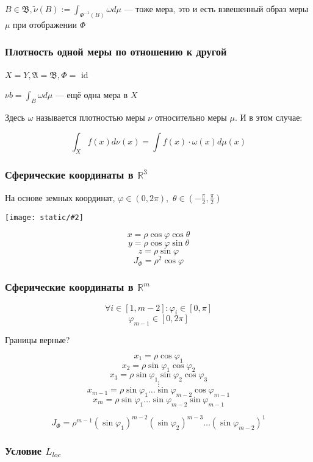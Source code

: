 \documentclass{article}
\def\dbl{\,\,}
\def\images#1#2{\begin{center}\texttt{[image: static/\#2]}\end{center}}
\begin{document}
$B \in \mathfrak{B}, \tilde{\nu}(B) := \int_{\Phi^{-1}(B)} \omega d\mu$ --- тоже мера, это и есть взвешенный образ меры $\mu$ при отображении $\Phi$

\subsubsection{Плотность одной меры по отношению к другой}

$X = Y, \mathfrak{A} = \mathfrak{B}, \Phi = $ id

$\nu b = \int_{B} \omega d \mu$ --- ещё одна мера в $X$

Здесь $\omega$ называется плотностью меры $\nu$ относительно меры $\mu$. И в этом случае:

\[\int_{X}f(x)d\nu(x) = \int f(x) \cdot \omega(x) d\mu(x)\]

\subsubsection{Сферические координаты в $\mathbb{R}^3$}

На основе земных координат, $\varphi \in (0, 2\pi), \dbl \theta \in \left(-\frac{\pi}{2}, \frac{\pi}{2}\right)$

\images{0.3}{sph_3d.jpg}

\[x = \rho \cos \varphi \cos \theta\]
\[y = \rho \cos \varphi \sin \theta\]
\[z = \rho \sin \varphi\]
\[J_{\Phi} = \rho ^ 2 \cos \varphi\]

\subsubsection{Сферические координаты в $\mathbb{R}^m$}
\[\forall i \in [1, m - 2]: \varphi_i \in [0, \pi]\]
\[\varphi_{m - 1} \in [0, 2\pi]\]

Границы верные?

\[x_1 = \rho \cos \varphi_1\]
\[x_2 = \rho \sin \varphi_1 \cos \varphi_2\]
\[x_3 = \rho \sin \varphi_1 \sin \varphi_2 \cos \varphi_3\]
\[\vdots\]
\[x_{m - 1} = \rho \sin \varphi_1 \ldots \sin \varphi_{m - 2} \cos \varphi_{m - 1}\]
\[x_{m} = \rho \sin \varphi_1 \ldots \sin \varphi_{m - 2} \sin \varphi_{m - 1}\]

\[J_{\Phi} = \rho^{m - 1}(\sin \varphi_1)^{m - 2} (\sin \varphi_2)^{m - 3} \ldots (\sin \varphi_{m - 2})^{1}\]

\subsubsection{Условие $L_{loc}$}
\end{document}
